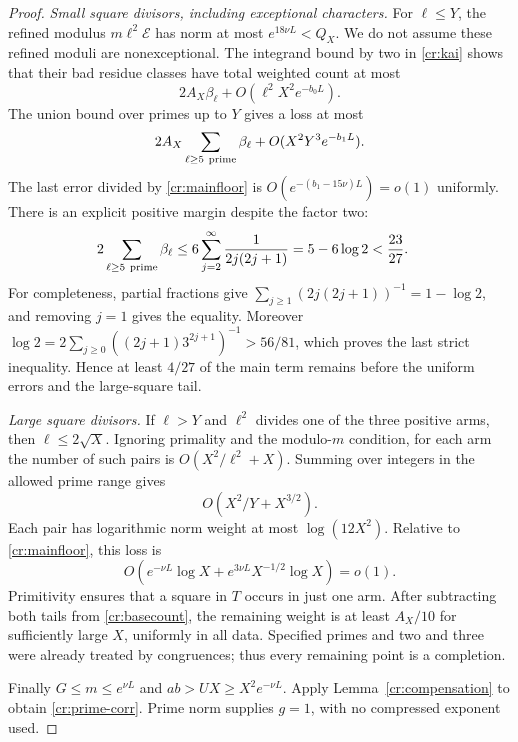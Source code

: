 \begin{proof}
\emph{Small square divisors, including exceptional characters.} For
$\ell\le Y$, the refined modulus $m\ell^2\mathcal E$ has norm at most
$e^{18\nu L}<Q_X$. We do not assume these refined moduli are nonexceptional.
The integrand bound by two in \eqref{cr:kai} shows that their bad residue
classes have total weighted count at most
\[
 2A_X\beta_\ell+O(\ell^2X^2e^{-b_0L}).
\]
The union bound over primes up to $Y$ gives a loss at most
\begin{equation}\label{cr:near}
 2A_X\sum_{\ell\ge5\ {\rm prime}}\beta_\ell
       +O(X^2Y^3e^{-b_1L}).
\end{equation}
The last error divided by \eqref{cr:mainfloor} is
$O(e^{-(b_1-15\nu)L})=o(1)$ uniformly.
There is an explicit positive margin despite the factor two:
\begin{align*}
 2\sum_{\ell\ge5\ {\rm prime}}\beta_\ell
 &\le6\sum_{j=2}^\infty\frac1{2j(2j+1)}
   =5-6\log2<\frac{23}{27}.
\end{align*}
For completeness, partial fractions give
$\sum_{j\ge1}(2j(2j+1))^{-1}=1-\log2$, and removing $j=1$ gives the equality.
Moreover
$\log2=2\sum_{j\ge0}((2j+1)3^{2j+1})^{-1}>56/81$,
which proves the last strict inequality. Hence at least $4/27$ of the main
term remains before the uniform errors and the large-square tail.

\emph{Large square divisors.} If $\ell>Y$ and $\ell^2$ divides one of the
three positive arms, then $\ell\le2\sqrt X$. Ignoring primality and the
modulo-$m$ condition, for each arm the number of such pairs is
$O(X^2/\ell^2+X)$. Summing over integers in the allowed prime range gives
\[
 O(X^2/Y+X^{3/2}).
\]
Each pair has logarithmic norm weight at most $\log(12X^2)$. Relative to
\eqref{cr:mainfloor}, this loss is
\[
 O(e^{-\nu L}\log X+e^{3\nu L}X^{-1/2}\log X)=o(1).
\]
Primitivity ensures that a square in $T$ occurs in just one arm. After
subtracting both tails from \eqref{cr:basecount}, the remaining weight is
at least $A_X/10$ for sufficiently large $X$, uniformly in all data.
Specified primes and two and three were already treated by congruences;
thus every remaining point is a completion.

Finally $G\le m\le e^{\nu L}$ and $ab>UX\ge X^2e^{-\nu L}$.
Apply Lemma~\ref{cr:compensation} to obtain \eqref{cr:prime-corr}.
Prime norm supplies $g=1$, with no compressed exponent used.
\end{proof}

